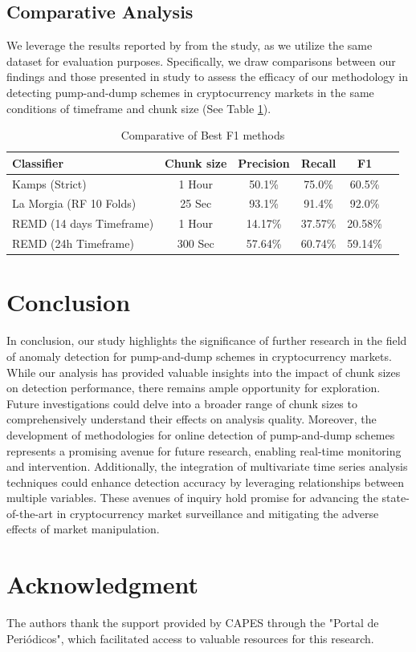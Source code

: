 \documentclass[12pt]{article}
\begin{document}
	\subsection{Comparative Analysis}
	\label{subsec_result_comparing}

	We leverage the results reported by \citet{lamorgia2020} from the \citet{kamps2018} study, as we utilize the same dataset for evaluation purposes.
	Specifically, we draw comparisons between our findings and those presented in \citet{kamps2018} study to assess the efficacy of our methodology in detecting pump-and-dump schemes in cryptocurrency markets in the same conditions of timeframe and chunk size (See Table \ref{tab_comparison}).

	\begin{table}[!ht]
        \centering
        \caption{Comparative of Best F1 methods}
        \begin{tabular}{lccccc}
            \toprule
            \textbf{Classifier} & \textbf{Chunk size} & \textbf{Precision} & \textbf{Recall} & \textbf{F1} \\
            \midrule
            Kamps (Strict) & 1 Hour & 50.1\% & 75.0\% & 60.5\% \\
            La Morgia (RF 10 Folds) & 25 Sec & 93.1\% & 91.4\% & 92.0\% \\
			REMD (14 days Timeframe)& 1 Hour & 14.17\% & 37.57\% & 20.58\% \\
            REMD (24h Timeframe) & 300 Sec & 57.64\% & 60.74\% & 59.14\% \\
            \bottomrule
        \end{tabular}
        \label{tab_comparison}
    \end{table}
	
	\section{Conclusion}
	\label{sec_conclusao}
	
	In conclusion, our study highlights the significance of further research in the field of anomaly detection for pump-and-dump schemes in cryptocurrency markets. While our analysis has provided valuable insights into the impact of chunk sizes on detection performance, there remains ample opportunity for exploration. Future investigations could delve into a broader range of chunk sizes to comprehensively understand their effects on analysis quality. Moreover, the development of methodologies for online detection of pump-and-dump schemes represents a promising avenue for future research, enabling real-time monitoring and intervention. Additionally, the integration of multivariate time series analysis techniques could enhance detection accuracy by leveraging relationships between multiple variables. These avenues of inquiry hold promise for advancing the state-of-the-art in cryptocurrency market surveillance and mitigating the adverse effects of market manipulation.
	
	\section*{Acknowledgment}
	The authors thank the support provided by CAPES through the "Portal de Periódicos", which facilitated access to valuable resources for this research.
	
    
	
	
\end{document}

